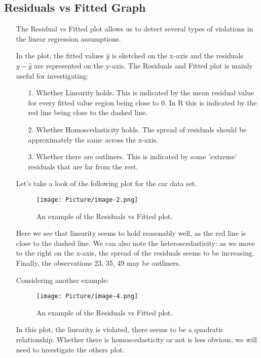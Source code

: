 \documentclass[a4paper]{article}
\begin{document}
\subsection{Residuals vs Fitted Graph}
\begin{itemize}
    \item[] The Residual vs Fitted plot allows us to detect several types of violations in the linear regression assumptions. 
    
    \item[] In the plot, the fitted values $\hat{y}$ is sketched on the x-axis and the residuals $y-\hat{y}$ are represented on the y-axis. The Residuals and Fitted plot is mainly useful for investigating:
    
    \begin{itemize}
        \item[1.] Whether Linearity holds. This is indicated by the mean residual value for every fitted value region being close to 0. In R this is indicated by the red line being close to the dashed line.
        
        \item[2.] Whether Homoscedasticity holds. The spread of residuals should be approximately the same across the x-axis.
        
        \item[3.] Whether there are outliners. This is indicated by some 'extreme' residuals that are far from the rest.
    \end{itemize}
    
    \item[] Let's take a look of the following plot for the car data set.
    
    \begin{figure}[H]
        \centering
        \texttt{[image: Picture/image-2.png]}
        \caption{An example of the Residuals vs Fitted plot.}
        \label{6.7.1}
    \end{figure}
    
    \item[] Here we see that linearity seems to hold reasonably well, as the red line is close to the dashed line. We can also note the heteroscedasticity: as we move to the right on the x-axis, the spread of the residuals seems to be increasing. Finally, the observations 23, 35, 49 may be outliners.
    
    \item[] Considering another example:
    
     \begin{figure}[H]
        \centering
        \texttt{[image: Picture/image-4.png]}
        \caption{An example of the Residuals vs Fitted plot.}
        \label{6.7.2}
    \end{figure}
    
    \item[] In this plot, the linearity is violated, there seems to be a quadratic relationship. Whether there is homoscedasticity or not is less obvious, we will need to investigate the others plot.
\end{itemize}
\end{document}
